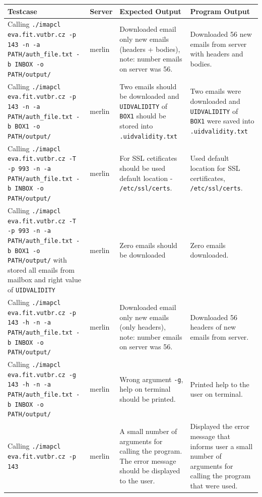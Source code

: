 \documentclass[a4paper,11pt]{article}
\begin{document}
\begin{center}
    \vspace{0.5cm} %
    \begin{tabularx}{\textwidth}{|>{\raggedright\arraybackslash}p{5cm}|>{\raggedright\arraybackslash}p{1cm}|>{\raggedright\arraybackslash}p{5cm}|>{\raggedright\arraybackslash}X|}
        \hline
        \textbf{Testcase} & \textbf{Server} & \textbf{Expected Output} & \textbf{Program Output} \\
        \hline
        Calling \texttt{./imapcl eva.fit.vutbr.cz -p 143 -n -a PATH/auth\_file.txt -b INBOX -o PATH/output/} & merlin & Downloaded email only new emails (headers + bodies), note: number emails on server was 56. & Downloaded 56 new emails from server with headers and bodies. \\
        \hline
        Calling \texttt{./imapcl eva.fit.vutbr.cz -p 143 -n -a PATH/auth\_file.txt -b BOX1 -o PATH/output/} & merlin & Two emails should be downloaded and \texttt{UIDVALIDITY} of \texttt{BOX1} should be stored into \texttt{.uidvalidity.txt} & Two emails were downloaded and \texttt{UIDVALIDITY} of \texttt{BOX1} were saved into \texttt{.uidvalidity.txt} \\
        \hline
        Calling \texttt{./imapcl eva.fit.vutbr.cz -T -p 993 -n -a PATH/auth\_file.txt -b INBOX -o PATH/output/} & merlin & For SSL cetificates should be used default location - \texttt{/etc/ssl/certs}. & Used default location for SSL certificates, \texttt{/etc/ssl/certs}. \\
        \hline
        Calling \texttt{./imapcl eva.fit.vutbr.cz -T -p 993 -n -a PATH/auth\_file.txt -b BOX1 -o PATH/output/} with stored all emails from mailbox and right value of \texttt{UIDVALIDITY} & merlin & Zero emails should be downloaded & Zero emails downloaded. \\
        \hline
        Calling \texttt{./imapcl eva.fit.vutbr.cz -p 143 -h -n -a PATH/auth\_file.txt -b INBOX -o PATH/output/} & merlin & Downloaded email only new emails (only headers), note: number emails on server was 56. & Downloaded 56 headers of new emails from server. \\
        \hline
        Calling \texttt{./imapcl eva.fit.vutbr.cz -g 143 -h -n -a PATH/auth\_file.txt -b INBOX -o PATH/output/} & merlin & Wrong argument \texttt{-g}, help on terminal should be printed. & Printed help to the user on terminal. \\
        \hline
        Calling \texttt{./imapcl eva.fit.vutbr.cz -p 143} & merlin & A small number of arguments for calling the program. The error message should be displayed to the user. & Displayed the error message that informs user a small number of arguments for calling the program that were used.\\
        \hline
    \end{tabularx}
    \vspace{0.5cm} %
\end{center}
\end{document}

